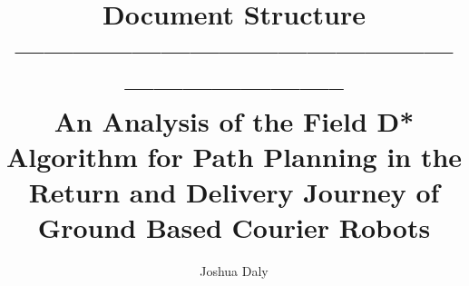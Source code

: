 \documentclass[12pt]{report}
\newlength{\defbaselineskip}
\newcommand{\setlinespacing}[1]%
           {\setlength{\baselineskip}{#1 \defbaselineskip}}
\begin{document}
\setlinespacing{1.5}

\title{Document Structure \\
-------------------------------------------------------------------- \\
An Analysis of the Field D* Algorithm for Path Planning in the Return and Delivery Journey of Ground Based Courier Robots}

\author{Joshua Daly}



\address{Dublin, Ireland}


\submitdate{\today}



\beforepreface

{ 
}

%

\afterpreface

\pagestyle{fancy}
\setcounter{page}{1}

%
%

%
%
%
%

%

%
\end{document}
